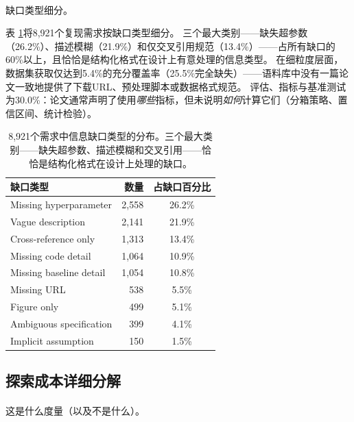\documentclass[
]{article}
\makeatletter
\let\oldparagraph\paragraph
\renewcommand{\paragraph}{
    \@ifstar
      \xxxParagraphStar
      \xxxParagraphNoStar
  }
\newcommand{\xxxParagraphStar}[1]{\oldparagraph*{#1}\mbox{}}
\newcommand{\xxxParagraphNoStar}[1]{\oldparagraph{#1}\mbox{}}
\theoremstyle{definition}
\makeatother
\begin{document}
\paragraph{缺口类型细分。}\label{ux7f3aux53e3ux7c7bux578bux7ec6ux5206}

表 \ref{tbl-gap-types}将8,921个复现需求按缺口类型细分。
三个最大类别------缺失超参数（26.2\%）、描述模糊（21.9\%）和仅交叉引用规范（13.4\%）------占所有缺口的60\%以上，且恰恰是结构化格式在设计上有意处理的信息类型。
在细粒度层面，数据集获取仅达到5.4\%的充分覆盖率（25.5\%完全缺失）------语料库中没有一篇论文一致地提供了下载URL、预处理脚本或数据格式规范。
评估、指标与基准测试为30.0\%：论文通常声明了使用\emph{哪些}指标，但未说明\emph{如何}计算它们（分箱策略、置信区间、统计检验）。

\begin{table}[htbp]
\centering
\small
\begin{tabular}{lrc}
\toprule
\textbf{缺口类型} & \textbf{数量} & \textbf{占缺口百分比} \\
\midrule
Missing hyperparameter & 2,558 & 26.2\% \\
Vague description & 2,141 & 21.9\% \\
Cross-reference only & 1,313 & 13.4\% \\
Missing code detail & 1,064 & 10.9\% \\
Missing baseline detail & 1,054 & 10.8\% \\
Missing URL & 538 & 5.5\% \\
Figure only & 499 & 5.1\% \\
Ambiguous specification & 399 & 4.1\% \\
Implicit assumption & 150 & 1.5\% \\
\bottomrule
\end{tabular}
\caption[信息缺口类型的分布]{8,921个需求中信息缺口类型的分布。三个最大类别------缺失超参数、描述模糊和交叉引用------恰恰是结构化格式在设计上处理的缺口。}
\label{tbl-gap-types}
\end{table}

\subsection{探索成本详细分解}\label{sec-app-exploration-tax}

\paragraph{这是什么度量（以及不是什么）。}\label{ux8fd9ux662fux4ec0ux4e48ux5ea6ux91cfux4ee5ux53caux4e0dux662fux4ec0ux4e48}
\end{document}
